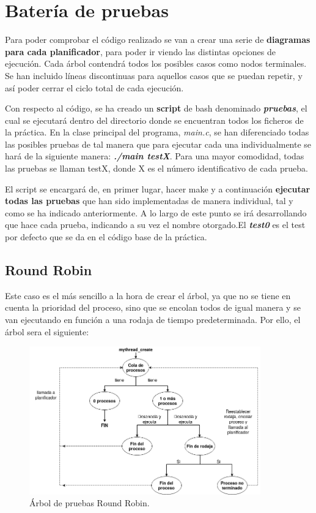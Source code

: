 \documentclass[10pt, spanish, pdftex]{template/UC3M_document}
\begin{document}
\section{Batería de pruebas}
Para poder comprobar el código realizado se van a crear una serie de \textbf{diagramas para cada planificador}, para poder ir viendo las distintas opciones de ejecución. Cada árbol contendrá todos los posibles casos como nodos terminales. Se han incluido líneas discontinuas para aquellos casos que se puedan repetir, y así poder cerrar el ciclo total de cada ejecución.

Con respecto al código, se ha creado un \textbf{script} de bash denominado \textbf{\textit{pruebas}}, el cual se ejecutará dentro del directorio donde se encuentran todos los ficheros de la práctica. En la clase principal del programa, \textit{main.c}, se han diferenciado todas las posibles pruebas de tal manera que para ejecutar cada una individualmente se hará de la siguiente manera: \textbf{\textit{./main testX}}. Para una mayor comodidad, todas las pruebas se llaman testX, donde X es el número identificativo de cada prueba.

El script se encargará de, en primer lugar, hacer make y a continuación \textbf{ejecutar todas las pruebas} que han sido implementadas de manera individual, tal y como se ha indicado anteriormente. A lo largo de este punto se irá desarrollando que hace cada prueba, indicando a su vez el nombre otorgado.El \textbf{\textit{test0}} es el test por defecto que se da en el código base de la práctica.

\subsection{Round Robin}
Este caso es el más sencillo a la hora de crear el árbol, ya que no se tiene en cuenta la prioridad del proceso, sino que se encolan todos de igual manera y se van ejecutando en función a una rodaja de tiempo predeterminada. Por ello, el árbol sera el siguiente:

\vspace{0.5cm}
\begin{figure}[h]
    \centering
    \includegraphics[width=10cm]{arboles/testRR.png}
    \caption{Árbol de pruebas Round Robin.}
\end{figure}
\end{document}
